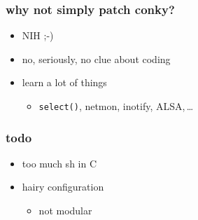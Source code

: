 \documentclass{beamer}
\begin{document}
\begin{frame}[fragile]
  \frametitle{why not simply patch conky?}
  \begin{itemize}
    \pause\item NIH ;-)
    \pause\item no, seriously, no clue about coding
    \pause\item learn a lot of things
    \begin{itemize}
      \pause\item \verb+select()+, netmon, inotify, ALSA,\,\dots
    \end{itemize}
  \end{itemize}
\end{frame}

\begin{frame}[fragile]
  \frametitle{todo}
  \begin{itemize}
    \pause\item too much sh in C
    \pause\item hairy configuration
    \begin{itemize}
      \item not modular
    \end{itemize}
  \end{itemize}
\end{frame}
\end{document}
